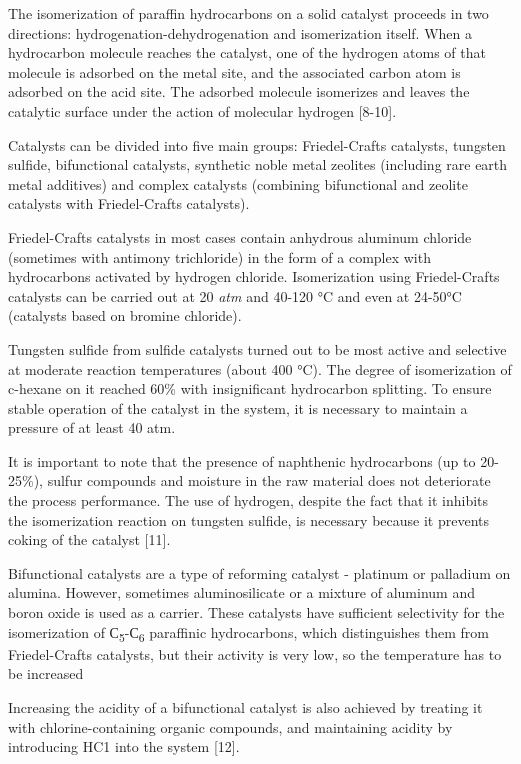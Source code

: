 \begin{multicols}{2}
The isomerization of paraffin hydrocarbons on a solid catalyst proceeds
in two directions: hydrogenation-dehydrogenation and isomerization
itself. When a hydrocarbon molecule reaches the catalyst, one of the
hydrogen atoms of that molecule is adsorbed on the metal site, and the
associated carbon atom is adsorbed on the acid site. The adsorbed
molecule isomerizes and leaves the catalytic surface under the action of
molecular hydrogen {[}8-10{]}.

Catalysts can be divided into five main groups: Friedel-Crafts
catalysts, tungsten sulfide, bifunctional catalysts, synthetic noble
metal zeolites (including rare earth metal additives) and complex
catalysts (combining bifunctional and zeolite catalysts with
Friedel-Crafts catalysts).

Friedel-Crafts catalysts in most cases contain anhydrous aluminum
chloride (sometimes with antimony trichloride) in the form of a complex
with hydrocarbons activated by hydrogen chloride. Isomerization using
Friedel-Crafts catalysts can be carried out at 20 \emph{atm} and 40-120
°C and even at 24-50°C (catalysts based on bromine chloride).

Tungsten sulfide from sulfide catalysts turned out to be most active and
selective at moderate reaction temperatures (about 400 °C). The degree
of isomerization of c-hexane on it reached 60\% with insignificant
hydrocarbon splitting. To ensure stable operation of the catalyst in the
system, it is necessary to maintain a pressure of at least 40 atm.

It is important to note that the presence of naphthenic hydrocarbons (up
to 20-25\%), sulfur compounds and moisture in the raw material does not
deteriorate the process performance. The use of hydrogen, despite the
fact that it inhibits the isomerization reaction on tungsten sulfide, is
necessary because it prevents coking of the catalyst {[}11{]}.

Bifunctional catalysts are a type of reforming catalyst - platinum or
palladium on alumina. However, sometimes aluminosilicate or a mixture of
aluminum and boron oxide is used as a carrier. These catalysts have
sufficient selectivity for the isomerization of
С\textsubscript{5}-С\textsubscript{6} paraffinic hydrocarbons, which
distinguishes them from Friedel-Crafts catalysts, but their activity is
very low, so the temperature has to be increased

Increasing the acidity of a bifunctional catalyst is also achieved by
treating it with chlorine-containing organic compounds, and maintaining
acidity by introducing HC1 into the system {[}12{]}.


\end{multicols}

